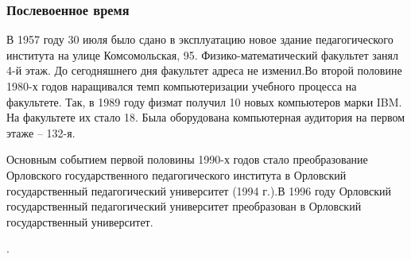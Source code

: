 \documentclass[pdf,hyperref={unicode}, aspectratio=43, serif,11pt]{beamer}
\begin{document}
\begin{frame}
\frametitle{Послевоенное время}
\tiny{
В 1957 году 30 июля было сдано в эксплуатацию новое здание педагогического института на улице Комсомольская, 95. Физико-математический факультет занял 4-й этаж. До сегодняшнего дня факультет адреса не изменил.Во второй половине 1980-х годов наращивался темп компьютеризации учебного процесса на факультете. Так, в 1989 году физмат получил 10 новых компьютеров марки IBM. На факультете их стало 18. Была оборудована компьютерная аудитория на первом этаже – 132-я.

Основным событием первой половины 1990-х годов стало преобразование Орловского государственного педагогического института в Орловский государственный педагогический университет (1994 г.).В 1996 году Орловский государственный педагогический университет преобразован в Орловский государственный университет.

.}
\begin{figure}[!h]
\centering
{}
\end{figure}

\end{frame}
\end{document}
